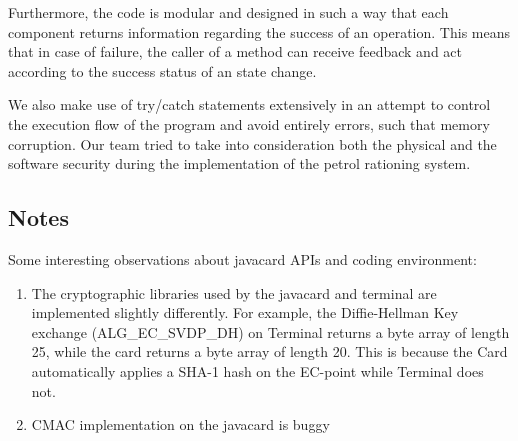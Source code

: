 \documentclass[a4paper,10pt]{llncs}
\begin{document}
Furthermore, the code is modular and designed in such a way that each component returns information regarding the success of an operation. This means that in case of failure, the caller of a method can receive feedback and act according to the success status of an state change.

We also make use of try/catch statements extensively in an attempt to control the execution flow of the program and avoid entirely errors, such that memory corruption. Our team tried to take into consideration both the physical and the software security during the implementation of the petrol rationing system.

\subsection{Notes}
Some interesting observations about javacard APIs and coding environment:

\begin{enumerate}
 \item The cryptographic libraries used by the javacard and terminal are implemented slightly differently. For example, the Diffie-Hellman Key exchange (ALG\_EC\_SVDP\_DH) on Terminal returns a byte array of length 25, while the card returns a byte array of length 20. This is because the Card automatically applies a SHA-1 hash on the EC-point while Terminal does not.
 \item CMAC implementation on the javacard is buggy
\end{enumerate}
\end{document}
